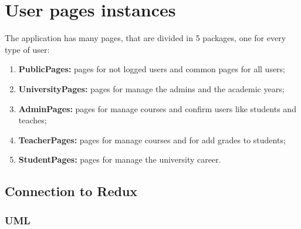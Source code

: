 \documentclass[../react.tex]{subfiles}
\begin{document}
	
	\section{User pages instances}
	The application has many pages, that are divided in 5 packages, one for every type of user:
	\begin{enumerate}
		\item \textbf{PublicPages: } pages for not logged users and common pages for all users;
		\item \textbf{UniversityPages: } pages for manage the admins and the academic years;
		\item \textbf{AdminPages: } pages for manage courses and confirm users like students and teaches;
		\item \textbf{TeacherPages: } pages for manage courses and for add grades to students;
		\item \textbf{StudentPages: } pages for manage the university career.
	\end{enumerate}
	
	\subsection{Connection to Redux}
		
	\subsubsection{UML}
\end{document}
